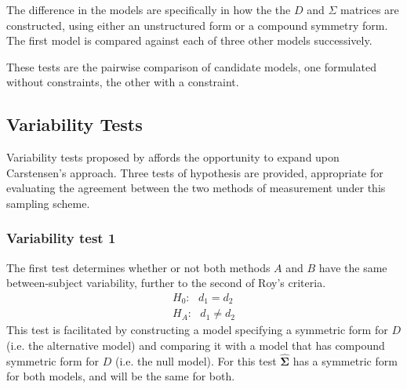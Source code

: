 \documentclass[12pt, a4paper]{report}
\theoremstyle{plain}
\theoremstyle{definition}
\theoremstyle{remark}
\begin{document}
	
	The difference in the models are specifically in how the the $D$ and $\Sigma$ matrices are constructed, using either an unstructured form or a compound symmetry form. The first model is compared against each of three other models successively.
	
	
	
	
	These tests are the pairwise comparison of candidate models, one formulated without constraints, the other with a constraint.
	
	
	
	
	
	

	\subsection{Variability Tests}
	
	
	

	
	Variability tests proposed by \citet{ARoy2009} affords the opportunity to expand upon Carstensen's approach. Three tests of hypothesis are provided, appropriate for evaluating the agreement between the two methods of measurement under this sampling scheme. 
	


	

	
	
	
	
	
	
	
	
	
	
	
	
	
	

	\subsubsection{Variability test 1}
	The first test determines whether or not both methods $A$ and $B$ have the same between-subject variability, further to the second of Roy's criteria.
	\begin{eqnarray*}
		H_{0}: \mbox{ }d_{1}  = d_{2} \\
		H_{A}: \mbox{ }d_{1}  \neq d_{2}
	\end{eqnarray*}
	This test is facilitated by constructing a model specifying a symmetric form for $D$ (i.e. the alternative model) and comparing it with a model that has compound symmetric form for $D$ (i.e. the null model). For this test $\boldsymbol{\hat{\Sigma}}$ has a symmetric form for both models, and will be the same for both.
		
\end{document}
